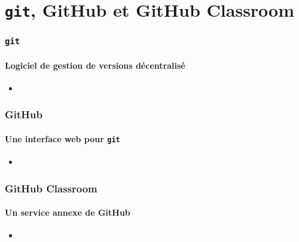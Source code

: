 \section{\texttt{git}, GitHub et GitHub Classroom}

\begin{frame}
\frametitle{\texttt{git}}
\framesubtitle{Logiciel de gestion de versions décentralisé}

\begin{itemize}
	\item	<1->
\end{itemize}

\end{frame}


\begin{frame}
\frametitle{GitHub}
\framesubtitle{Une interface web pour \texttt{git}}

\begin{itemize}
	\item	<1->	
	
\end{itemize}

\end{frame}


\begin{frame}
\frametitle{GitHub Classroom}
\framesubtitle{Un service annexe de GitHub}

\begin{itemize}
	\item	<1->	
	
\end{itemize}

\end{frame}
